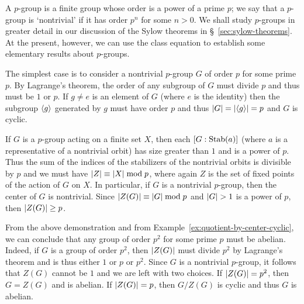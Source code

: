 \begin{example}
    \label{ex:p-group}
    A \(p\)-group is a finite group whose order is a power of a prime \(p\); we
    say that a \(p\)-group is `nontrivial' if it has order \(p^n\) for some \(n
    > 0\). We shall study \(p\)-groups in greater detail in our discussion of
    the Sylow theorems in \S~\ref{sec:sylow-theorems}. At the present, however,
    we can use the class equation to establish some elementary results about
    \(p\)-groups.

    The simplest case is to consider a nontrivial \(p\)-group \(G\) of order
    \(p\) for some prime \(p\). By Lagrange's theorem, the order of any subgroup
    of \(G\) must divide \(p\) and thus must be \(1\) or \(p\). If \(g \neq e\)
    is an element of \(G\) (where \(e\) is the identity) then the subgroup
    \(\langle g \rangle\) generated by \(g\) must have order \(p\) and thus \(\lvert G \rvert =
    \lvert \langle g \rangle \rvert = p\) and \(G\) is cyclic.

    If \(G\) is a \(p\)-group acting on a finite set \(X\), then each \([G :
    \operatorname{Stab}(a)]\) (where \(a\) is a representative of a nontrivial orbit) has size
    greater than \(1\) and is a power of \(p\). Thus the sum of the indices of
    the stabilizers of the nontrivial orbits is divisible by \(p\) and we must
    have \(\lvert Z \rvert \equiv \lvert X \rvert \bmod p\), where again \(Z\) is the set of
    fixed points of the action of \(G\) on \(X\). In particular, if \(G\) is a
    nontrivial \(p\)-group, then the center of \(G\) is nontrivial. Since
    \(\lvert Z(G) \rvert \equiv \lvert G \rvert \bmod p\) and \(\lvert G \rvert > 1\) is a power
    of \(p\), then \(\lvert Z(G) \rvert \geq p\).

    From the above demonstration and from
    Example~\ref{ex:quotient-by-center-cyclic}, we can conclude that any group
    of order \(p^2\) for some prime \(p\) must be abelian. Indeed, if \(G\) is a
    group of order \(p^2\), then \(\lvert Z(G) \rvert\) must divide \(p^2\) by
    Lagrange's theorem and is thus either \(1\) or \(p\) or \(p^2\). Since \(G\)
    is a nontrivial \(p\)-group, it follows that \(Z(G)\) cannot be \(1\) and we
    are left with two choices. If \(\lvert Z(G) \rvert = p^2\), then \(G = Z(G)\) and
    is abelian. If \(\lvert Z(G) \rvert = p\), then \(G/Z(G)\) is cyclic and thus
    \(G\) is abelian.
\end{example}

